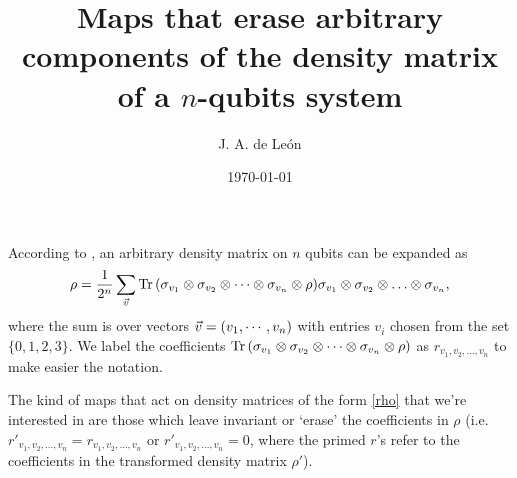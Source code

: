 \documentclass[11pt]{article}
\begin{document}
\title{Maps that erase arbitrary components of the density matrix of a $n$-qubits system} %
\author{J. A. de Le\'on} 


\date{\today}  

\maketitle


According to \cite{nielsen_chuang_2011}, an arbitrary density matrix on $n$
qubits can be expanded as
\begin{align}
	\rho = \frac{1}{2^n}\sum _{\vec{v}} \Tr 
                  \qty( \sigma _{v_1} \otimes \sigma_{v_2} \otimes 
               \cdots \otimes \sigma_{v_n} \otimes \rho) \sigma _{v_1} \otimes 
             \sigma_{v_2} \otimes \ldots \otimes \sigma_{v_n},
	\label{rho}
\end{align}
where the sum is over vectors $\vec{v}=\qty(v_1,\cdots, v_n)$ with entries
$v_i$ chosen from the set $\{0,1,2,3\}$. We label the coefficients $\Tr \qty(
\sigma _{v_1} \otimes \sigma_{v_2} \otimes \cdots \otimes \sigma_{v_n} \otimes
\rho )$ as $r_{v_1, v_2,\ldots, v_n}$ to make easier the notation. 

The kind of maps that act on density matrices of the form \eqref{rho} that
we're interested in are those which leave invariant or `erase' the coefficients
in $\rho$ (i.e. $r'_{v_1, v_2,\ldots, v_n}=r_{v_1, v_2,\ldots, v_n}$ or
$r'_{v_1, v_2,\ldots, v_n}=0$, where the primed $r$'s refer to the coefficients
in the transformed density matrix $\rho '$). 
\end{document}
